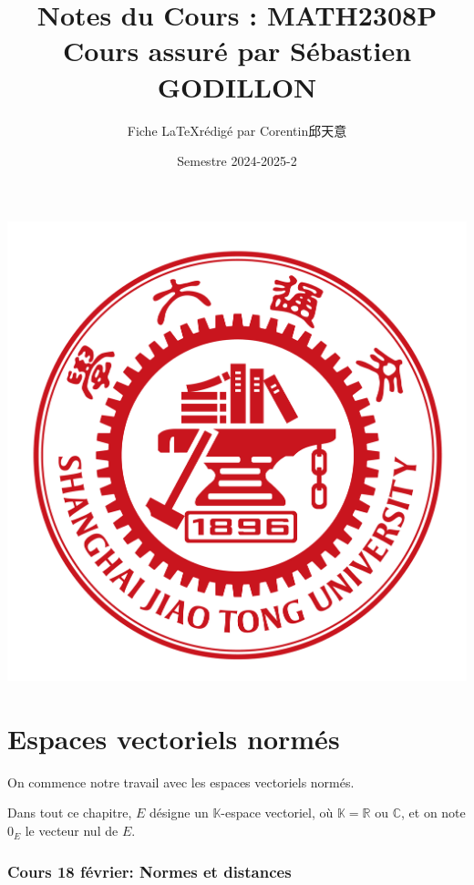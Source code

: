 \documentclass{article}
\title{\textbf{Notes du Cours : MATH2308P}\\ Cours assuré par Sébastien GODILLON}
\author{Fiche \LaTeX \space rédigé par Corentin邱天意}
\date{Semestre 2024-2025-2}
\begin{document}
\maketitle

\centerline{\includegraphics[scale=0.4]{sjtu}}

\newpage
\tableofcontents

\newpage

\part{Espaces vectoriels normés}

On commence notre travail avec les espaces vectoriels normés. 

Dans tout ce chapitre, $E$ désigne un $\mathbb{K}$-espace vectoriel, où $\mathbb{K} = \mathbb{R}$ ou $\mathbb{C}$, et on note $0_E$ le vecteur nul de $E$.



\section{Cours 18 février: Normes et distances}
\end{document}

